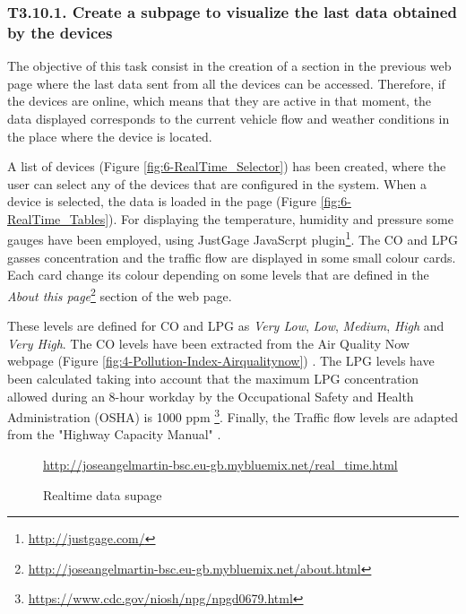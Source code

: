 \subsubsection{T3.10.1. Create a subpage to visualize the last data obtained by the devices}
The objective of this task consist in the creation of a section in the previous web page where the last data sent from all the devices can be accessed. Therefore, if the devices are online, which means that they are active in that moment, the data displayed corresponds to the current vehicle flow and weather conditions in the place where the device is located.

A list of devices (Figure \ref{fig:6-RealTime_Selector}) has been created, where the user can select any of the devices that are configured in the system. When a device is selected, the data is loaded in the page (Figure \ref{fig:6-RealTime_Tables}). For displaying the temperature, humidity and pressure some gauges have been employed, using JustGage JavaScrpt plugin\footnote{\url{http://justgage.com/}}. The CO and LPG gasses concentration and the traffic flow are displayed in some small colour cards. Each card change its colour depending on some levels that are defined in the \textit{About this page}\footnote{\url{http://joseangelmartin-bsc.eu-gb.mybluemix.net/about.html}} section of the web page. 

These levels are defined for CO and LPG as \textit{Very Low}, \textit{Low}, \textit{Medium}, \textit{High} and \textit{Very High}. The CO levels have been extracted from the Air Quality Now webpage (Figure \ref{fig:4-Pollution-Index-Airqualitynow}) \cite{airqualitynow}. The LPG levels have been calculated taking into account that the maximum LPG concentration allowed during an 8-hour workday by the Occupational Safety and Health Administration (OSHA) is 1000 ppm \footnote{\url{https://www.cdc.gov/niosh/npg/npgd0679.html}}. Finally, the Traffic flow levels are adapted from the "Highway Capacity Manual" \cite{HCM2000}.

\begin{figure}[htb]
	\centering
	\caption{Realtime data supage}
	\label{fig:6-RealTime}{\url{http://joseangelmartin-bsc.eu-gb.mybluemix.net/real_time.html}}
\end{figure}


